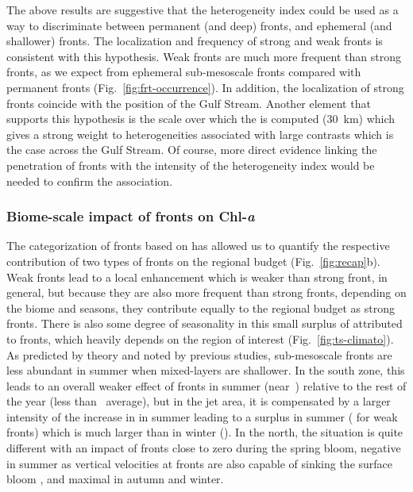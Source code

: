 The above results are suggestive that the heterogeneity index could be used as a way to discriminate between permanent (and deep) fronts, and ephemeral (and shallower) fronts.
The localization and frequency of strong and weak fronts is consistent with this hypothesis.
Weak fronts are much more frequent than strong fronts, as we expect from ephemeral sub-mesoscale fronts compared with permanent fronts (Fig.~\ref{fig:frt-occurrence}).
In addition, the localization of strong fronts coincide with the position of the Gulf Stream.
Another element that supports this hypothesis is the scale over which the  is computed (\qty{30}{\km}) which gives a strong weight to  heterogeneities associated with large contrasts which is the case across the Gulf Stream.
Of course, more direct evidence linking the penetration of fronts with the intensity of the heterogeneity index would be needed to confirm the association.

\subsubsection{Biome-scale impact of fronts on Chl-\emph{a}}

The categorization of fronts based on  has allowed us to quantify the respective contribution of two types of fronts on the regional  budget (Fig.~\ref{fig:recap}b).
Weak fronts lead to a local  enhancement which is weaker than strong front, in general, but because they are also more frequent than strong fronts, depending on the biome and seasons, they contribute equally to the regional  budget as strong fronts.
There is also some degree of seasonality in this small surplus of  attributed to fronts, which heavily depends on the region of interest (Fig.~\ref{fig:ts-climato}).
As predicted by theory and noted by previous studies, sub-mesoscale fronts  are less abundant in summer when mixed-layers are shallower.
In the south zone, this leads to an overall weaker effect of fronts in summer (near~) relative to the rest of the year (less than~ average), but in the jet area, it is compensated by a larger intensity of the increase in  in summer leading to a  surplus in summer ( for weak fronts) which is much larger than in winter ().
In the north, the situation is quite different with an impact of fronts close to zero during the spring bloom, negative in summer as vertical velocities at fronts are also capable of sinking the surface bloom \parencite{levy_2018}, and maximal in autumn and winter.

